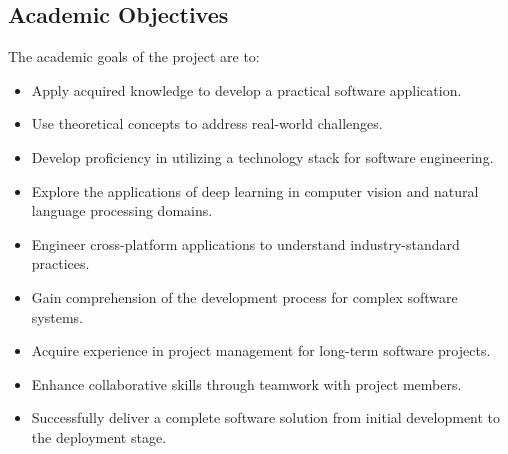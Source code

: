 \subsection{Academic Objectives}
The academic goals of the project are to:
\begin{itemize}
    \item Apply acquired knowledge to develop a practical software application.
    \item Use theoretical concepts to address real-world challenges.
    \item Develop proficiency in utilizing a technology stack for software engineering.
    \item Explore the applications of deep learning in computer vision and natural language processing domains.
    \item Engineer cross-platform applications to understand industry-standard practices.
    \item Gain comprehension of the development process for complex software systems.
    \item Acquire experience in project management for long-term software projects.
    \item Enhance collaborative skills through teamwork with project members.
    \item Successfully deliver a complete software solution from initial development to the deployment stage.
\end{itemize}
 
